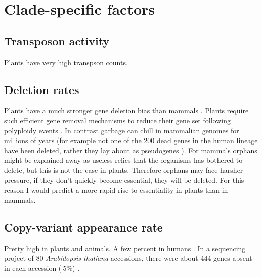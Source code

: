 \section{Clade-specific factors}

\subsection{Transposon activity}

    Plants have very high transpson counts.

\subsection{Deletion rates}

    Plants have a much stronger gene deletion bias than mammals
    \cite{freeling_fractionation_2012}. Plants require such efficient gene
    removal mechanisms to reduce their gene set following polyploidy events
    \cite{thomas_following_2006, woodhouse_following_2010}. In contrast garbage
    can chill in mammalian genomes for millions of years (for example not one
    of the 200 dead genes in the human lineage have been deleted, rather they
    lay about as pseudogenes \cite{schrider_all_2009}).  For mammals orphans
    might be explained away as useless relics that the organisms has bothered
    to delete, but this is not the case in plants.  Therefore orphans may face
    harsher pressure, if they don't quickly become essential, they will be
    deleted. For this reason I would predict a more rapid rise to essentiality
    in plants than in mammals.

\subsection{Copy-variant appearance rate}

    Pretty high in plants and animals. A few percent in humans
    \cite{check_human_2005}. In a sequencing project of 80 \textit{Arabidopsis
    thaliana} accessions, there were about 444 genes absent in each accession
    ($~5\%$) \cite{tan_variation_2012}.
